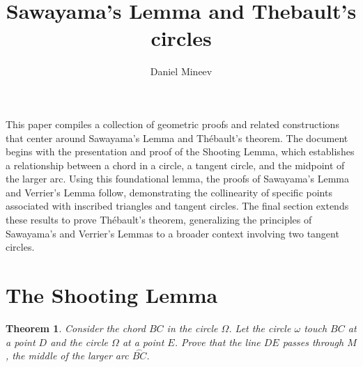 \documentclass{article}
\author{Daniel Mineev}
\title{Sawayama's Lemma and Thebault's circles}
\date{}
\newtheorem{theorem}{Theorem}
\newcommand{\tarc}{\frown}
\newcommand{\arc}[1]{\stackrel{\tarc}{#1}}
\begin{document}
\maketitle

This paper compiles a collection of geometric proofs and related constructions that center around Sawayama's Lemma and Thébault's theorem. The document begins with the presentation and proof of the Shooting Lemma, which establishes a relationship between a chord in a circle, a tangent circle, and the midpoint of the larger arc. Using this foundational lemma, the proofs of Sawayama's Lemma and Verrier's Lemma follow, demonstrating the collinearity of specific points associated with inscribed triangles and tangent circles. The final section extends these results to prove Thébault's theorem, generalizing the principles of Sawayama's and Verrier's Lemmas to a broader context involving two tangent circles.

\section{The Shooting Lemma}

\begin{theorem}
	Consider the chord \(BC\) in the circle \(\Omega\). Let the circle \(\omega\) touch \(BC\) at a point \(D\) and the circle \(\Omega\) at a point \(E\). Prove that the line \(DE\) passes through \(M\), the middle of the larger arc \(\arc{BC}\).
\end{theorem}

\begin{center}
    \centering
\end{center}
\end{document}
